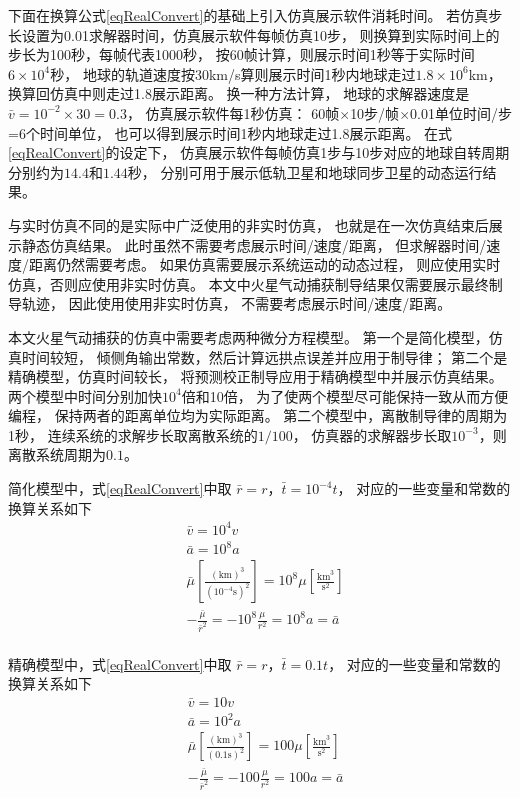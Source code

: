 下面在换算公式\eqref{eqRealConvert}的基础上引入仿真展示软件消耗时间。
若仿真步长设置为0.01求解器时间，仿真展示软件每帧仿真10步，
则换算到实际时间上的步长为100秒，每帧代表1000秒，
按60帧计算，则展示时间1秒等于实际时间$6\times10^4$秒，
地球的轨道速度按30km/s算则展示时间1秒内地球走过$1.8\times10^6$km，
换算回仿真中则走过1.8展示距离。
换一种方法计算，
地球的求解器速度是$\bar{v}=10^{-2}\times30=0.3$，
仿真展示软件每1秒仿真：
60帧$\times$10步/帧$\times$0.01单位时间/步=6个时间单位，
也可以得到展示时间1秒内地球走过1.8展示距离。
在式\eqref{eqRealConvert}的设定下，
仿真展示软件每帧仿真1步与10步对应的地球自转周期分别约为$14.4$和$1.44$秒，
分别可用于展示低轨卫星和地球同步卫星的动态运行结果。

与实时仿真不同的是实际中广泛使用的非实时仿真，
也就是在一次仿真结束后展示静态仿真结果。
此时虽然不需要考虑展示时间/速度/距离，
但求解器时间/速度/距离仍然需要考虑。
如果仿真需要展示系统运动的动态过程，
则应使用实时仿真，否则应使用非实时仿真。
本文中火星气动捕获制导结果仅需要展示最终制导轨迹，
因此使用使用非实时仿真，
不需要考虑展示时间/速度/距离。

本文火星气动捕获的仿真中需要考虑两种微分方程模型。
第一个是简化模型，仿真时间较短，
倾侧角输出常数，然后计算远拱点误差并应用于制导律；
第二个是精确模型，仿真时间较长，
将预测校正制导应用于精确模型中并展示仿真结果。
两个模型中时间分别加快$10^4$倍和10倍，
为了使两个模型尽可能保持一致从而方便编程，
保持两者的距离单位均为实际距离。
第二个模型中，离散制导律的周期为1秒，
连续系统的求解步长取离散系统的$1/100$，
仿真器的求解器步长取$10^{-3}$，则离散系统周期为$0.1$。

简化模型中，式\eqref{eqRealConvert}中取
$\bar{r}=r$，$\bar{t}=10^{-4}t$，
对应的一些变量和常数的换算关系如下
\begin{align*}
    &\bar{v} = 10^4v \\
    &\bar{a} = 10^8a \\
    &\bar{\mu}\left[\frac{(\text{km})^3}{(10^{-4}\text{s})^2}\right]
     = 10^8\mu\left[\frac{\text{km}^3}{\text{s}^2}\right] \\
    &-\frac{\bar{\mu}}{\bar{r}^2} = -10^8\frac{\mu}{r^2} = 10^8a = \bar{a} \\
\end{align*}

精确模型中，式\eqref{eqRealConvert}中取
$\bar{r}=r$，$\bar{t}=0.1t$，
对应的一些变量和常数的换算关系如下
\begin{align*}
    &\bar{v} = 10v \\
    &\bar{a} = 10^2a \\
    &\bar{\mu}\left[\frac{(\text{km})^3}{(0.1\text{s})^2}\right]
     = 100\mu\left[\frac{\text{km}^3}{\text{s}^2}\right] \\
    &-\frac{\bar{\mu}}{\bar{r}^2} = -100\frac{\mu}{r^2} = 100a = \bar{a} \\
\end{align*}

